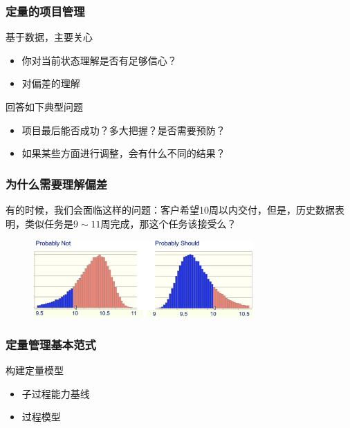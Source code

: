 \subsubsection{定量的项目管理}
基于数据，主要关心
\vspace{-0.8em}
\begin{multicols}{2}
    \begin{itemize}
        \item 你对当前状态理解是否有足够信心？
        \item 对偏差的理解
    \end{itemize}
\end{multicols}
\vspace{-1em}

回答如下典型问题
\vspace{-0.8em}
\begin{multicols}{2}
    \begin{itemize}
        \item 项目最后能否成功？多大把握？是否需要预防？
        \item 如果某些方面进行调整，会有什么不同的结果？
    \end{itemize}
\end{multicols}
\vspace{-1em}

\subsubsection{为什么需要理解偏差}
有的时候，我们会面临这样的问题：客户希望10周以内交付，但是，历史数据表明，类似任务是$9\sim 11$周完成，那这个任务该接受么？
\begin{figure}[H]
    \vspace{-0.5em}
	\centering
	\includegraphics[width=0.75\textwidth]{images/为什么需要理解偏差.png}
    \vspace{-1em}
\end{figure}

\subsubsection{定量管理基本范式}
构建定量模型
\vspace{-0.8em}
\begin{multicols}{2}
    \begin{itemize}
        \item 子过程能力基线
        \item 过程模型
    \end{itemize}
\end{multicols}
\vspace{-1em}

